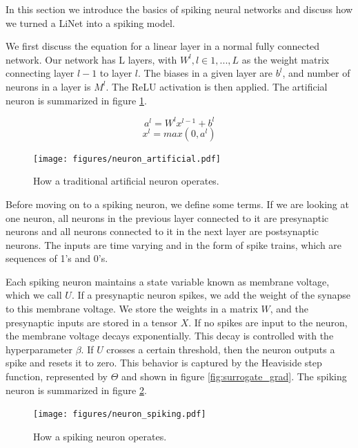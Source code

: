 \documentclass[../taasin.tex]{subfiles}
\begin{document}

In this section we introduce the basics of spiking neural networks and discuss how we turned a LiNet into a spiking model.

We first discuss the equation for a linear layer in a normal fully connected network. Our network has L layers, with $W^l, l \in {1, ..., L}$ as the weight matrix connecting layer $l-1$ to layer $l$. The biases in a given layer are $b^l$, and number of neurons in a layer is $M^l$. The ReLU activation is then applied. The artificial neuron is summarized in figure \ref{fig:neuron_ann}.

$$ a^l =  W^l x^{l-1} + b^l $$
$$ x^l = max(0, a^l) $$

\begin{figure}[h]
    \centering
    \texttt{[image: figures/neuron\_artificial.pdf]}
    \caption{How a traditional artificial neuron operates.}
    \label{fig:neuron_ann}
\end{figure}

Before moving on to a spiking neuron, we define some terms. If we are looking at one neuron, all neurons in the previous layer connected to it are presynaptic neurons and all neurons connected to it in the next layer are postsynaptic neurons. The inputs are time varying and in the form of spike trains, which are sequences of 1's and 0's. 

Each spiking neuron maintains a state variable known as membrane voltage, which we call $U$. If a presynaptic neuron spikes, we add the weight of the synapse to this membrane voltage. We store the weights in a matrix $W$, and the presynaptic inputs are stored in a tensor $X$. If no spikes are input to the neuron, the membrane voltage decays exponentially. This decay is controlled with the hyperparameter $\beta$. If $U$ crosses a certain threshold, then the neuron outputs a spike and resets it to zero. This behavior is captured by the Heaviside step function, represented by $\Theta$ and shown in figure \ref{fig:surrogate_grad}. The spiking neuron is summarized in figure \ref{fig:neuron_snn}.

\begin{figure}[h]
    \centering
    \texttt{[image: figures/neuron\_spiking.pdf]}
    \caption{How a spiking neuron operates.}
    \label{fig:neuron_snn}
\end{figure}
\end{document}
